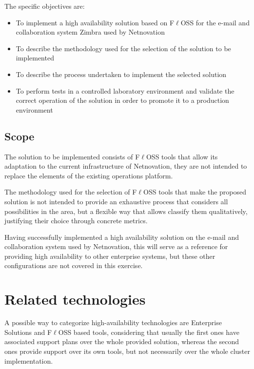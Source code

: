 \documentclass[a4paper, 12pt]{book}
\begin{document}
\noindent The specific objectives are:

\begin{itemize}
	\item To implement a high availability solution based on F$\ell$OSS for the e-mail and collaboration system Zimbra used by Netnovation
	\item To describe the methodology used for the selection of the solution to be implemented
	\item To describe the process undertaken to implement the selected solution
	\item To perform tests in a controlled laboratory environment and validate the correct operation of the solution in order to promote it to a production environment
\end{itemize}


\section{Scope}
\label{sec:scope}

The solution to be implemented consists of F$\ell$OSS tools that allow its adaptation to the current infrastructure of Netnovation, they are not intended to replace the elements of the existing operations  platform.\bigskip

\noindent The methodology used for the selection of F$\ell$OSS tools that make the proposed solution is not intended to provide an exhaustive process that considers all possibilities in the area, but a flexible way that allows classify them qualitatively, justifying their choice through concrete metrics.\bigskip

\noindent Having successfully implemented a high availability solution on the e-mail and collaboration system used by Netnovation, this will serve as a reference for providing high availability to other enterprise systems, but these other configurations are not covered in this exercise.\bigskip


%
\chapter{Related technologies}
\label{chap:related}
A possible way to categorize high-availability technologies are Enterprise Solutions and F$\ell$OSS based tools, considering that usually the first ones have associated support plans over the whole provided solution, whereas the second ones provide support over its own tools, but not necessarily over the whole cluster implementation.
\end{document}
